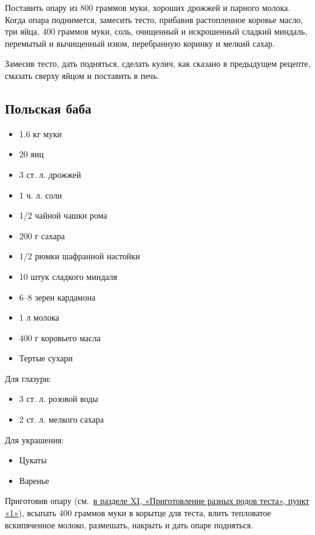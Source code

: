 Поставить опару из 800 граммов муки, хороших дрожжей и парного молока. Когда опара поднимется, замесить тесто, прибавив растопленное коровье масло, три яйца, 400 граммов муки, соль, очищенный и искрошенный сладкий миндаль, перемытый и вычищенный изюм, перебранную коринку и мелкий сахар.

Замесив тесто, дать подняться, сделать кулич, как сказано в предыдущем рецепте, смазать сверху яйцом и поставить в печь.

\subsection{Польская баба}

\begin{itemize}
	\item 1.6 кг муки
    \item 20 яиц 
    \item 3 ст. л. дрожжей
    \item 1 ч. л. соли
    \item 1/2 чайной чашки рома
    \item 200 г сахара 
    \item 1/2 рюмки шафранной настойки
    \item 10 штук сладкого миндаля
    \item 6–8 зерен кардамона
    \item 1 л молока
    \item 400 г коровьего масла
    \item Тертые сухари 
\end{itemize}
    
Для глазури: 
    
\begin{itemize}
	\item 3 ст. л. розовой воды 
    \item 2 ст. л. мелкого сахара
\end{itemize}

Для украшения: 

\begin{itemize}
	\item Цукаты
    \item Варенье
\end{itemize}

Приготовив опару (см.~\hyperref[sub:drozhzhevoje]{в разделе XI, «Приготовление разных родов теста», пункт «1»}), всыпать 400 граммов муки в корытце для теста, влить тепловатое вскипяченное молоко, размешать, накрыть и дать опаре подняться.

